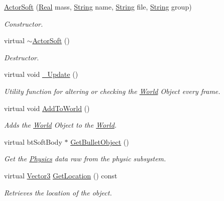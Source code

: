 \begin{DoxyCompactItemize}
\item 
\hyperlink{classMezzanine_1_1ActorSoft_a3ab7c4cb45c0308a1b398069095d81b2}{Actor\-Soft} (\hyperlink{namespaceMezzanine_a726731b1a7df72bf3583e4a97282c6f6}{Real} mass, \hyperlink{namespaceMezzanine_acf9fcc130e6ebf08e3d8491aebcf1c86}{String} name, \hyperlink{namespaceMezzanine_acf9fcc130e6ebf08e3d8491aebcf1c86}{String} file, \hyperlink{namespaceMezzanine_acf9fcc130e6ebf08e3d8491aebcf1c86}{String} group)
\begin{DoxyCompactList}\small\item\em Constructor. \end{DoxyCompactList}\item 
virtual \hyperlink{classMezzanine_1_1ActorSoft_a4701cb3e90164c828247a43ff098f69b}{$\sim$\-Actor\-Soft} ()
\begin{DoxyCompactList}\small\item\em Destructor. \end{DoxyCompactList}\item 
virtual void \hyperlink{classMezzanine_1_1ActorSoft_a1f255e52f48a9fec2cfe2f91664fb350}{\-\_\-\-Update} ()
\begin{DoxyCompactList}\small\item\em Utility function for altering or checking the \hyperlink{classMezzanine_1_1World}{World} Object every frame.  \end{DoxyCompactList}\item 
virtual void \hyperlink{classMezzanine_1_1ActorSoft_ad314e449aea1ac0b641816f68a861159}{Add\-To\-World} ()
\begin{DoxyCompactList}\small\item\em Adds the \hyperlink{classMezzanine_1_1World}{World} Object to the \hyperlink{classMezzanine_1_1World}{World}.  \end{DoxyCompactList}\item 
virtual bt\-Soft\-Body $\ast$ \hyperlink{classMezzanine_1_1ActorSoft_ab0ddf931ccde766dc5e040077f1a3ec4}{Get\-Bullet\-Object} ()
\begin{DoxyCompactList}\small\item\em Get the \hyperlink{namespaceMezzanine_1_1Physics}{Physics} data raw from the physic subsystem. \end{DoxyCompactList}\item 
virtual \hyperlink{classMezzanine_1_1Vector3}{Vector3} \hyperlink{classMezzanine_1_1ActorSoft_a0192b3889eaf2786352d75ca03fcae4a}{Get\-Location} () const 
\begin{DoxyCompactList}\small\item\em Retrieves the location of the object. \end{DoxyCompactList}\item 

\end{DoxyCompactItemize}
